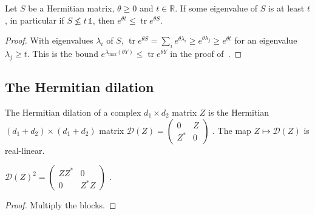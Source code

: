 \begin{theorem}
    \label{thm:trace_exp_eigenvalue_tail}
    \leanok
    Let $S$ be a Hermitian matrix, $\theta\ge0$ and $t\in\mathbb{R}$. If some
    eigenvalue of $S$ is at least $t$, in particular if $S\not\le t\,\mathbb{1}$,
    then $e^{\theta t}\le\operatorname{tr}e^{\theta S}$.
\end{theorem}
\begin{proof}\leanok
    With eigenvalues $\lambda_i$ of $S$,
    $\operatorname{tr}e^{\theta S}=\sum_ie^{\theta\lambda_i}\ge e^{\theta\lambda_j}
        \ge e^{\theta t}$ for an eigenvalue $\lambda_j\ge t$. This is the bound
    $e^{\lambda_{\max}(\theta Y)}\le\operatorname{tr}e^{\theta Y}$ in the proof
    of~\cite[Proposition~3.1]{Tropp2012User}.
\end{proof}

\subsection{The Hermitian dilation}

\begin{definition}
    \label{def:hermitian_dilation}
    \leanok
    The Hermitian dilation of a complex $d_1\times d_2$ matrix $Z$ is the
    Hermitian $(d_1+d_2)\times(d_1+d_2)$ matrix
    $\mathcal{D}(Z)=\begin{pmatrix}0&Z\\Z^{*}&0\end{pmatrix}$
    \cite[Equation~(2.10)]{Tropp2012User}. The map $Z\mapsto\mathcal{D}(Z)$ is
    real-linear.
\end{definition}

\begin{theorem}
    \label{thm:hermitian_dilation_square}
    \leanok
    $\mathcal{D}(Z)^{2}=\begin{pmatrix}ZZ^{*}&0\\0&Z^{*}Z\end{pmatrix}$
    \cite[Equation~(2.11)]{Tropp2012User}.
\end{theorem}
\begin{proof}\leanok
    Multiply the blocks.
\end{proof}

